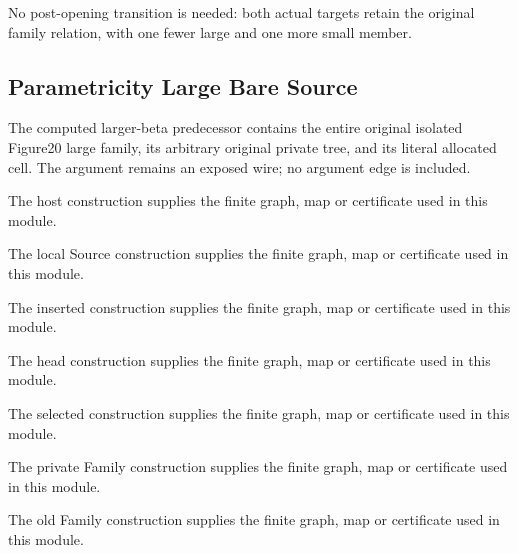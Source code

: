 No post-opening transition is needed: both actual targets retain the
original family relation, with one fewer large and one more small member.
\par{}

\subsection{Parametricity Large Bare Source}
The computed larger-beta predecessor contains the entire original
isolated Figure20 large family, its arbitrary original private tree, and its literal
allocated cell. The argument remains an exposed wire; no argument edge is included.

The host construction supplies the finite graph, map or certificate used in this module.
\par{}

The local Source construction supplies the finite graph, map or certificate used in this module.
\par{}

The inserted construction supplies the finite graph, map or certificate used in this module.
\par{}

The head construction supplies the finite graph, map or certificate used in this module.
\par{}

The selected construction supplies the finite graph, map or certificate used in this module.
\par{}

The private Family construction supplies the finite graph, map or certificate used in this module.
\par{}

The old Family construction supplies the finite graph, map or certificate used in this module.
\par{}

